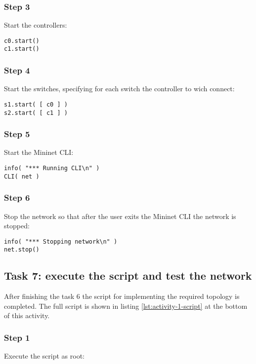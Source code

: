 \subsubsection*{Step 3}
Start the controllers:
\begin{lstlisting}
c0.start()
c1.start()
\end{lstlisting}

\subsubsection*{Step 4}
Start the switches, specifying for each switch the controller to wich connect:
\begin{lstlisting}
s1.start( [ c0 ] )
s2.start( [ c1 ] )
\end{lstlisting}

\subsubsection*{Step 5}
Start the Mininet CLI:
\begin{lstlisting}
info( "*** Running CLI\n" )
CLI( net )
\end{lstlisting}

\subsubsection*{Step 6}
Stop the network so that after the user exits the Mininet CLI the network is
stopped:
\begin{lstlisting}
info( "*** Stopping network\n" )
net.stop()
\end{lstlisting}




\subsection*{Task 7: execute the script and test the network}
After finishing the task 6 the script for implementing the required topology is
completed. The full script is shown in listing \ref{lst:activity-1-script} at the
bottom of this activity.

\subsubsection*{Step 1}
Execute the script as root: \\

